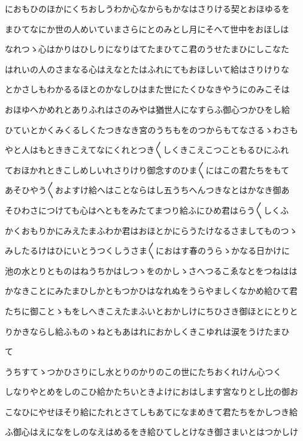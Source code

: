 \documentclass[a4paper,11pt,landscape]{ltjtarticle}
\begin{document}
におもひのほかにくちおしうわか心なからもかなはさりける契とおほゆるを
\par\medskip
まひてなにか世の人めいていまさらにとのみとし月にそへて世中をおほしは
\par\medskip
なれつゝ心はかりはひしりになりはてたまひてこ君のうせたまひにしこなた
\par\medskip
はれいの人のさまなる心はえなとたはふれにてもおほしいて給はさりけりな
\par\medskip
とかさしもわかるるほとのかなしひはまた世にたくひなきやうにのみこそは
\par\medskip
おほゆへかめれとありふれはさのみやは猶世人になすらふ御心つかひをし給
\par\medskip
ひていとかくみくるしくたつきなき宮のうちもをのつからもてなさるゝわさも
\par\medskip
やと人はもとききこえてなにくれとつき〱しくきこえこつこともるひにふれ
\par\medskip
ておほかれときこしめしいれさりけり御念すのひま〱にはこの君たちをもて
\par\medskip
あそひやう〱およすけ給へはことならはし五うちへんつきなとはかなき御あ
\par\medskip
そひわさにつけても心はへともをみたてまつり給ふにひめ君はらう〱しくふ
\par\medskip
かくおもりかにみえたまふわか君はおほとかにらうたけなるさましてものつゝ
\par\medskip
みしたるけはひにいとうつくしうさま〱におはす春のうらゝかなる日かけに
\par\medskip
池の水とりとものはねうちかはしつゝをのかしゝさへつるこゑなとをつねはは
\par\medskip
かなきことにみたまひしかともつかひはなれぬをうらやましくなかめ給ひて君
\par\medskip
たちに御ことゝもをしへきこえたまふいとおかしけにちひさき御ほとにとりと
\par\medskip
りかきならし給ふものゝねともあはれにおかしくきこゆれは涙をうけたまひ
\par\medskip
て
\par\medskip
うちすてゝつかひさりにし水とりのかりのこの世にたちおくれけん心つく
\par\medskip
しなりやとめをしのこひ給かたちいときよけにおはします宮なりとし比の御お
\par\medskip
こなひにやせほそり給にたれとさてしもあてになまめきて君たちをかしつき給
\par\medskip
ふ御心はえになをしのなえはめるをき給ひてしとけなき御さまいとはつかしけ
\par\medskip
\end{document}
